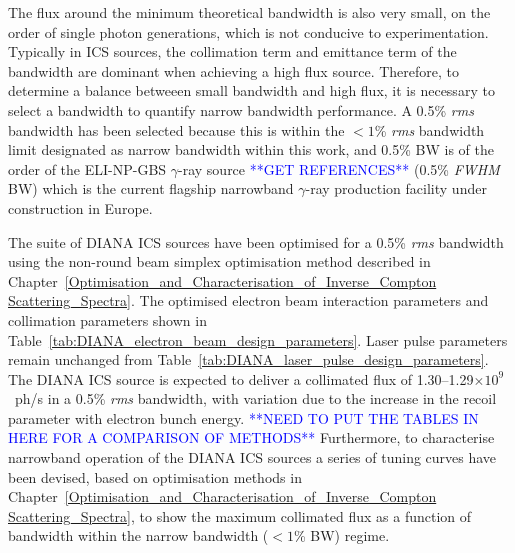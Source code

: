 \documentclass[../main.tex]{subfiles}
\begin{document}
The flux around the minimum theoretical bandwidth is also very small, on the order of single photon generations, which is not conducive to experimentation. Typically in ICS sources, the collimation term and emittance term of the bandwidth are dominant when achieving a high flux source. Therefore, to determine a balance betweeen small bandwidth and high flux, it is necessary to select a bandwidth to quantify narrow bandwidth performance. A 0.5\% \textit{rms} bandwidth has been selected because this is within the $<1$\% \textit{rms} bandwidth limit designated as narrow bandwidth within this work, and 0.5\%  BW is of the order of the ELI-NP-GBS $\gamma$-ray source \cite{} \textcolor{blue}{**GET REFERENCES**} (0.5\% \textit{FWHM} BW) which is the current flagship narrowband $\gamma$-ray production facility under construction in Europe. 

The suite of DIANA ICS sources have been optimised for a 0.5\% \textit{rms} bandwidth using the non-round beam simplex optimisation method described in Chapter~\ref{Optimisation_and_Characterisation_of_Inverse_Compton Scattering_Spectra}. The optimised electron beam interaction parameters and collimation parameters shown in Table~\ref{tab:DIANA_electron_beam_design_parameters}. Laser pulse parameters remain unchanged from Table~\ref{tab:DIANA_laser_pulse_design_parameters}. The DIANA ICS source is expected to deliver a collimated flux of 1.30--1.29$\times 10^{9}$~ph/\si{\second} in a 0.5\% \textit{rms} bandwidth, with variation due to the increase in the recoil parameter with electron bunch energy. \textcolor{blue}{**NEED TO PUT THE TABLES IN HERE FOR A COMPARISON OF METHODS**} Furthermore, to characterise narrowband operation of the DIANA ICS sources a series of tuning curves have been devised, based on optimisation methods in Chapter~\ref{Optimisation_and_Characterisation_of_Inverse_Compton Scattering_Spectra}, to show the maximum collimated flux as a function of bandwidth within the narrow bandwidth ($<1$\%  BW) regime. 
\end{document}

